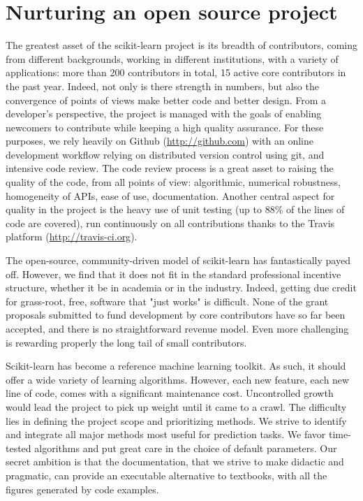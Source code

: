 \documentclass[a4paper]{article}
\begin{document}
\section{Nurturing an open source project}

The greatest asset of the scikit-learn project is its breadth of
contributors, coming from different backgrounds, working in different
institutions, with a variety of applications: more than 200 contributors in
total, 15 active core contributors in the past year. Indeed, not only
is there strength in numbers, but also the convergence of points of views
make better code and better design. From a developer's perspective, the
project is managed with the goals of enabling newcomers to
contribute while keeping a high quality assurance. For these purposes, we
rely heavily on Github (\url{http://github.com}) with an online
development workflow relying on distributed version control using git,
and intensive code review. The code review process is a great asset to
raising the quality of the code, from all points of view: algorithmic,
numerical robustness, homogeneity of APIs, ease of use, documentation.
Another central aspect for quality in the project is the heavy use of
unit testing (up to 88\% of the lines of code are covered), run
continuously on all contributions thanks to the Travis platform
(\url{http://travis-ci.org}).

The open-source, community-driven model of scikit-learn has fantastically
payed off. However, we find that it does not fit in the standard
professional incentive structure, whether it be in academia or in the
industry. Indeed, getting due credit for grass-root, free, software that
"just works" is difficult. None of the grant proposals submitted to fund
development by core contributors have so far been accepted, and there is
no straightforward revenue model. Even more challenging is rewarding
properly the long tail of small contributors.

Scikit-learn has become a reference machine learning toolkit. As such, it
should offer a wide variety of learning algorithms. However, each new
feature, each new line of code, comes with a significant maintenance cost.
Uncontrolled growth would lead the project to pick up weight until it
came to a crawl. The difficulty lies in defining the project scope and
prioritizing methods. We strive to identify and integrate all major
methods most useful for prediction tasks. We favor time-tested
algorithms and put great care in the choice of default parameters. Our
secret ambition is that the documentation, that we strive to make
didactic and pragmatic, can provide an executable alternative to
textbooks, with all the figures generated by code examples.




\end{document}
